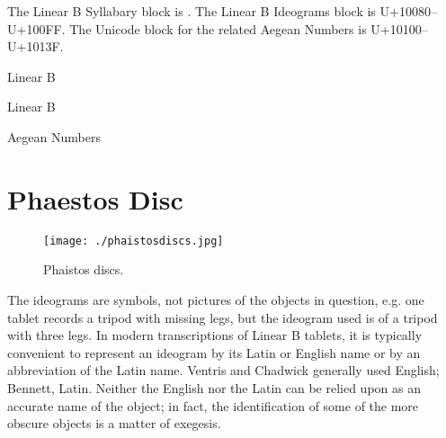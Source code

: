 The Linear B Syllabary block is . The Linear B Ideograms block is {\smallcps U+10080–U+100FF}. The Unicode block for the related Aegean Numbers is U+10100–U+1013F.

\begin{scriptexample}[]{Linear B}

\end{scriptexample}

\begin{scriptexample}[]{Linear B}
\end{scriptexample}


\begin{scriptexample}[]{Aegean Numbers}

\end{scriptexample}





\section{Phaestos Disc}

\begin{figure}[htp]
\centering

\texttt{[image: ./phaistosdiscs.jpg]}
\caption{Phaistos discs.}
\end{figure}




The ideograms are symbols, not pictures of the objects in question, e.g. one tablet records a tripod with missing legs, but the ideogram used is of a tripod with three legs. In modern transcriptions of Linear B tablets, it is typically convenient to represent an ideogram by its Latin or English name or by an abbreviation of the Latin name. Ventris and Chadwick generally used English; Bennett, Latin. Neither the English nor the Latin can be relied upon as an accurate name of the object; in fact, the identification of some of the more obscure objects is a matter of exegesis.

